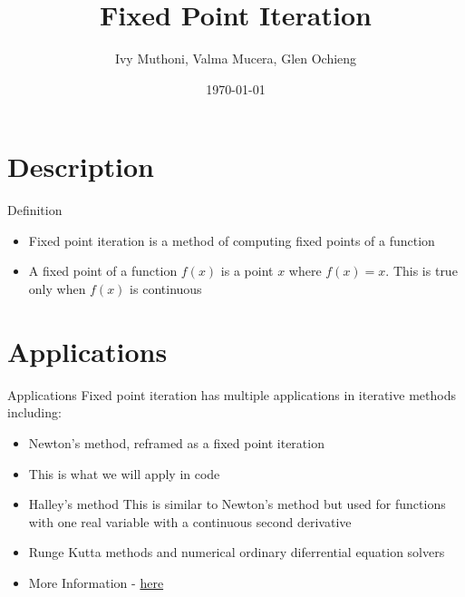 \documentclass[14pt]{beamer}
\title{Fixed Point Iteration}
\author[Ivy, Valma, Glen]{Ivy Muthoni, Valma Mucera, Glen Ochieng}
\date{\today}
\begin{document}
\maketitle

\section{Description}
\begin{frame}{Definition}
    \begin{itemize}
        \item<1->Fixed point iteration is a method of computing fixed points of a function
        \item<2->A fixed point of a function $f(x)$ is a point $x$ where $f(x) = x$.\newline
        This is true only when $f(x)$ is continuous
    \end{itemize}

\end{frame}

\section{Applications}
\begin{frame}{Applications}
    Fixed point iteration has multiple applications in iterative methods including:
    \begin{itemize}
        \item<1->Newton's method, reframed as a fixed point iteration
        \item<2>\small{This is what we will apply in code}
        \item<3->Halley's method\newline
        \small{This is similar to Newton's method but used for functions with one real variable with a continuous second derivative}
        \item<4->Runge Kutta methods and numerical ordinary diferrential equation solvers
        \item<5->More Information - \href{https://en.wikipedia.org/wiki/Fixed-point_iteration}{here}
    \end{itemize}
\end{frame}
\end{document}
